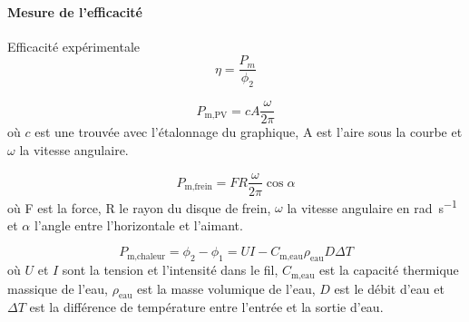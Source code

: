 \paragraph{Mesure de l'efficacité}

Efficacité expérimentale
\begin{equation}
    \eta = \frac{P_m}{\phi_2}
    \label{eq:efficacite}
\end{equation}

\begin{equation}
    P_\textrm{m,PV} = c A \frac{\omega}{2 \pi}
    \label{eq:pm_pv}
\end{equation}
où \(c\) est une trouvée avec l'étalonnage du graphique, A est l'aire sous la courbe et \(\omega\) la vitesse angulaire.

\begin{equation}
    P_\textrm{m,frein} = F R \frac{\omega}{2 \pi} \cos{\alpha}
    \label{eq:pm_frein}
\end{equation}
où F est la force, R le rayon du disque de frein, \(\omega\) la vitesse angulaire en \si{\radian\per\second} et \(\alpha\) l'angle entre l'horizontale et l'aimant.

\begin{equation}
    P_\textrm{m,chaleur} = \phi_2 - \phi_1 = UI - C_\textrm{m,eau} \rho_\textrm{eau} D \Delta T
    \label{eq:pm_chaleur}
\end{equation}
où \(U\) et \(I\) sont la tension et l'intensité dans le fil, \(C_\textrm{m,eau}\) est la capacité thermique massique de l'eau, \(\rho_\textrm{eau}\) est la masse volumique de l'eau, \(D\) est le débit d'eau et \(\Delta T\) est la différence de température entre l'entrée et la sortie d'eau.

